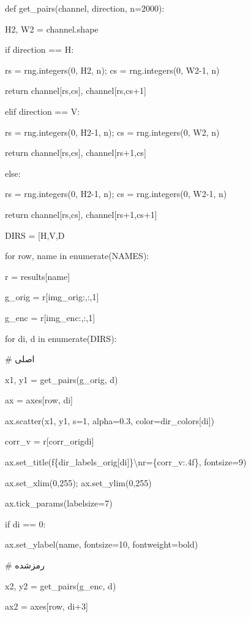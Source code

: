 def get\_pairs(channel, direction, n=2000):

H2, W2 = channel.shape

if direction == \textquotesingle H\textquotesingle:

rs = rng.integers(0, H2, n); cs = rng.integers(0, W2-1, n)

return channel{[}rs,cs{]}, channel{[}rs,cs+1{]}

elif direction == \textquotesingle V\textquotesingle:

rs = rng.integers(0, H2-1, n); cs = rng.integers(0, W2, n)

return channel{[}rs,cs{]}, channel{[}rs+1,cs{]}

else:

rs = rng.integers(0, H2-1, n); cs = rng.integers(0, W2-1, n)

return channel{[}rs,cs{]}, channel{[}rs+1,cs+1{]}

DIRS = {[}\textquotesingle H\textquotesingle,\textquotesingle V\textquotesingle,\textquotesingle D\textquotesingle{]}

for row, name in enumerate(NAMES):

r = results{[}name{]}

g\_orig = r{[}\textquotesingle img\_orig\textquotesingle{]}{[}:,:,1{]}

g\_enc = r{[}\textquotesingle img\_enc\textquotesingle{]}{[}:,:,1{]}

for di, d in enumerate(DIRS):

\# اصلی

x1, y1 = get\_pairs(g\_orig, d)

ax = axes{[}row, di{]}

ax.scatter(x1, y1, s=1, alpha=0.3, color=dir\_colors{[}di{]})

corr\_v = r{[}\textquotesingle corr\_orig\textquotesingle{]}{[}di{]}

ax.set\_title(f\textquotesingle\{dir\_labels\_orig{[}di{]}\}\textbackslash nr=\{corr\_v:.4f\}\textquotesingle, fontsize=9)

ax.set\_xlim(0,255); ax.set\_ylim(0,255)

ax.tick\_params(labelsize=7)

if di == 0:

ax.set\_ylabel(name, fontsize=10, fontweight=\textquotesingle bold\textquotesingle)

\# رمزشده

x2, y2 = get\_pairs(g\_enc, d)

ax2 = axes{[}row, di+3{]}

